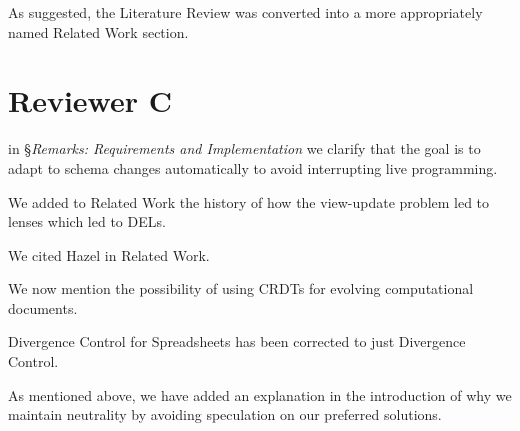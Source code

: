 \documentclass{article}
\begin{document}
As suggested, the Literature Review was converted into a more appropriately named Related Work section.


\section{Reviewer C}

in \S\emph{Remarks: Requirements and Implementation} we clarify that the goal is to adapt to schema changes automatically to avoid interrupting live programming.

We added to Related Work the history of how the view-update problem led to lenses which led to DELs.

We cited Hazel in Related Work.

We now mention the possibility of using CRDTs for evolving computational documents.

Divergence Control for Spreadsheets has been corrected to just Divergence Control.

As mentioned above, we have added an explanation in the introduction of why we maintain neutrality by avoiding speculation on our preferred solutions.
\end{document}
